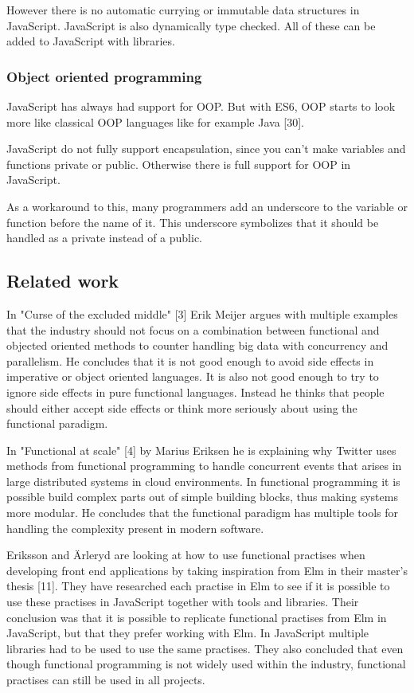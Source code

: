 \documentclass {article}
\begin{document}
However there is no automatic currying or immutable data structures in JavaScript. JavaScript is also dynamically type checked. All of these can be added to JavaScript with libraries.
\subsubsection{Object oriented programming}
JavaScript has always had support for OOP. But 
with ES6, OOP starts to look more like classical OOP languages like for example Java [30].

JavaScript do not fully support encapsulation, since you can't make variables and functions private or public. Otherwise there is full support for OOP in JavaScript.

As a  workaround to this, many programmers add an underscore to the variable or function before the name of it. This underscore symbolizes that it should be handled as a private instead of a public.
\subsection{Related work}
In "Curse of the excluded middle" [3] Erik Meijer argues with multiple examples that the industry should not focus on a combination between functional and objected oriented methods to counter handling big data with concurrency and parallelism. He concludes that it is not good enough to avoid side effects in imperative or object oriented languages. It is also not good enough to try to ignore side effects in pure functional languages. Instead he thinks that people should either accept side effects or think more seriously about using the functional paradigm.

In "Functional at scale" [4] by Marius Eriksen he is explaining why Twitter uses methods from functional programming to handle concurrent events that arises in large distributed systems in cloud environments. In functional programming it is possible build complex parts out of simple building blocks, thus making systems more modular. He concludes that the functional paradigm has multiple tools for handling the complexity present in modern software.

Eriksson and \"{A}rleryd are looking at how to use functional practises when developing front end applications by taking inspiration from Elm in their master's thesis [11]. They have researched each practise in Elm to see if it is possible to use these practises in JavaScript together with tools and libraries. Their conclusion was that it is possible to replicate functional practises from Elm in JavaScript, but that they prefer working with Elm. In JavaScript multiple libraries had to be used to use the same practises. They also concluded that even though functional programming is not widely used within the industry, functional practises can still be used in all projects.
\end{document}
